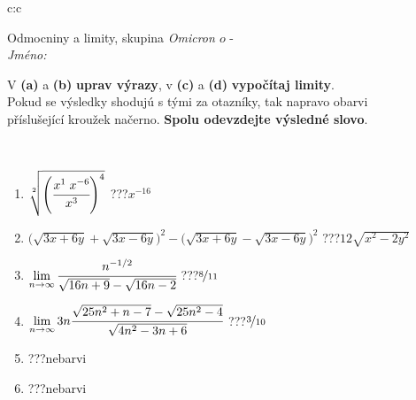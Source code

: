 \documentclass[10pt]{report}
\newcommand\omicron{o}
\begin{document}
\newpage
\thispagestyle{empty}
\begin{tabular}{c:c}
\begin{minipage}[c][104.5mm][t]{0.5\linewidth}
\begin{center}
\vspace{7mm}
{\huge Odmocniny a limity, skupina \textit{Omicron $\omicron$} -}\\[5mm]
\textit{Jméno:}\phantom{xxxxxxxxxxxxxxxxxxxxxxxxxxxxxxxxxxxxxxxxxxxxxxxxxxxxxxxxxxxxxxxxx}\\[5mm]
\begin{minipage}{0.95\linewidth}
\begin{center}
V \textbf{(a)} a \textbf{(b)} \textbf{uprav výrazy}, v \textbf{(c)} a \textbf{(d)} \textbf{vypočítaj limity}.\\Pokud se výsledky shodujú s tými za otazníky, tak napravo obarvi\\příslušející kroužek načerno. \textbf{Spolu odevzdejte výsledné slovo}.
\end{center}
\end{minipage}
\\[1mm]
\begin{minipage}{0.79\linewidth}
\begin{center}
\begin{varwidth}{\linewidth}
\begin{enumerate}
\small
\item $\sqrt[2]{\left(\cfrac{x^{1}\;x^{-6}}{x^{3}}\right)^{4}}$\quad \dotfill\; ???\;\dotfill \quad $x^{-16}$
\item {\footnotesize{\scriptsize$\big(\sqrt{3x+6y}+\sqrt{3x-6y}\big)^2-\big(\sqrt{3x+6y}-\sqrt{3x-6y}\big)^2$}\quad \dotfill\; ???\;\dotfill \quad $12\sqrt{x^2-2y^2}$}
\item $\lim\limits_{n\to\infty}\cfrac{n^{-1/2}}{\sqrt{16n+9}-\sqrt{16n-2}}$\quad \dotfill\; ???\;\dotfill \quad $\nicefrac{8}{11}$
\item $\lim\limits_{n\to\infty}3n\cfrac{\sqrt{25n^2+n-7}-\sqrt{25n^2-4}}{\sqrt{4n^2-3n+6}}$\quad \dotfill\; ???\;\dotfill \quad $\nicefrac{3}{10}$
\item \quad \dotfill\; ???\;\dotfill \quad nebarvi
\item \quad \dotfill\; ???\;\dotfill \quad nebarvi
\end{enumerate}
\end{varwidth}
\end{center}
\end{minipage}
\begin{minipage}{0.20\linewidth}

\end{minipage}
\end{center}
\end{minipage}
\end{tabular}
\end{document}
